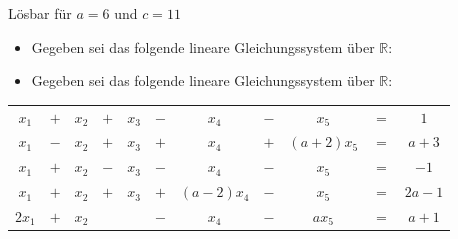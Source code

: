 Lösbar für $a = 6$ und $c = 11$

\begin{itemize}[leftmargin=*, label={a)}]
\item Gegeben sei das folgende lineare Gleichungssystem über $\mathbb{R}$:
\end{itemize}

\newpage

\begin{itemize}[leftmargin=*, label={b)}]
\item Gegeben sei das folgende lineare Gleichungssystem über $\mathbb{R}$:
\end{itemize}

\begin{tabular}{ccccccccccc}
$x_1$ & $+$ & $x_2$ & $+$ & $x_3$ & $-$ & $x_4$ & $-$ & $x_5$ & $=$ & $1$\\
$x_1$ & $-$ & $x_2$ & $+$ & $x_3$ & $+$ & $x_4$ & $+$ & $(a+2)x_5$ & $=$ & $a+3$\\
$x_1$ & $+$ & $x_2$ & $-$ & $x_3$ & $-$ & $x_4$ & $-$ & $x_5$ & $=$ & $-1$\\
$x_1$ & $+$ & $x_2$ & $+$ & $x_3$ & $+$ & $(a-2)x_4$ & $-$ & $x_5$ & $=$ & $2a - 1$\\
$2x_1$ & $+$ & $x_2$ & & & $-$ & $x_4$ & $-$ & $a x_5$ & $=$ & $a + 1$\\
\end{tabular}\\~\\


